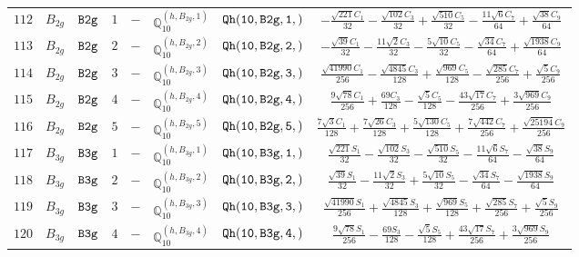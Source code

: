 \documentclass[fleqn,8pt]{jsarticle}
\begin{document}
\begin{table}[ht!]
\begin{center}
\begin{tabular}{cccccccc}
$ 112 $ & $ B_{2g} $ & $ {\tt B2g} $ & $ 1 $ & $ - $ & $ \mathbb{Q}_{10}^{(h,B_{2g},1)} $ & $ {\tt Qh(10,B2g,1,)} $ & $ - \frac{\sqrt{221} C_{1}}{32} - \frac{\sqrt{102} C_{3}}{32} + \frac{\sqrt{510} C_{5}}{32} - \frac{11 \sqrt{6} C_{7}}{64} + \frac{\sqrt{38} C_{9}}{64} $ \\
$ 113 $ & $ B_{2g} $ & $ {\tt B2g} $ & $ 2 $ & $ - $ & $ \mathbb{Q}_{10}^{(h,B_{2g},2)} $ & $ {\tt Qh(10,B2g,2,)} $ & $ - \frac{\sqrt{39} C_{1}}{32} - \frac{11 \sqrt{2} C_{3}}{32} - \frac{5 \sqrt{10} C_{5}}{32} - \frac{\sqrt{34} C_{7}}{64} + \frac{\sqrt{1938} C_{9}}{64} $ \\
$ 114 $ & $ B_{2g} $ & $ {\tt B2g} $ & $ 3 $ & $ - $ & $ \mathbb{Q}_{10}^{(h,B_{2g},3)} $ & $ {\tt Qh(10,B2g,3,)} $ & $ \frac{\sqrt{41990} C_{1}}{256} - \frac{\sqrt{4845} C_{3}}{128} + \frac{\sqrt{969} C_{5}}{128} - \frac{\sqrt{285} C_{7}}{256} + \frac{\sqrt{5} C_{9}}{256} $ \\
$ 115 $ & $ B_{2g} $ & $ {\tt B2g} $ & $ 4 $ & $ - $ & $ \mathbb{Q}_{10}^{(h,B_{2g},4)} $ & $ {\tt Qh(10,B2g,4,)} $ & $ \frac{9 \sqrt{78} C_{1}}{256} + \frac{69 C_{3}}{128} - \frac{\sqrt{5} C_{5}}{128} - \frac{43 \sqrt{17} C_{7}}{256} + \frac{3 \sqrt{969} C_{9}}{256} $ \\
$ 116 $ & $ B_{2g} $ & $ {\tt B2g} $ & $ 5 $ & $ - $ & $ \mathbb{Q}_{10}^{(h,B_{2g},5)} $ & $ {\tt Qh(10,B2g,5,)} $ & $ \frac{7 \sqrt{3} C_{1}}{128} + \frac{7 \sqrt{26} C_{3}}{128} + \frac{5 \sqrt{130} C_{5}}{128} + \frac{7 \sqrt{442} C_{7}}{256} + \frac{\sqrt{25194} C_{9}}{256} $ \\
$ 117 $ & $ B_{3g} $ & $ {\tt B3g} $ & $ 1 $ & $ - $ & $ \mathbb{Q}_{10}^{(h,B_{3g},1)} $ & $ {\tt Qh(10,B3g,1,)} $ & $ \frac{\sqrt{221} S_{1}}{32} - \frac{\sqrt{102} S_{3}}{32} - \frac{\sqrt{510} S_{5}}{32} - \frac{11 \sqrt{6} S_{7}}{64} - \frac{\sqrt{38} S_{9}}{64} $ \\
$ 118 $ & $ B_{3g} $ & $ {\tt B3g} $ & $ 2 $ & $ - $ & $ \mathbb{Q}_{10}^{(h,B_{3g},2)} $ & $ {\tt Qh(10,B3g,2,)} $ & $ \frac{\sqrt{39} S_{1}}{32} - \frac{11 \sqrt{2} S_{3}}{32} + \frac{5 \sqrt{10} S_{5}}{32} - \frac{\sqrt{34} S_{7}}{64} - \frac{\sqrt{1938} S_{9}}{64} $ \\
$ 119 $ & $ B_{3g} $ & $ {\tt B3g} $ & $ 3 $ & $ - $ & $ \mathbb{Q}_{10}^{(h,B_{3g},3)} $ & $ {\tt Qh(10,B3g,3,)} $ & $ \frac{\sqrt{41990} S_{1}}{256} + \frac{\sqrt{4845} S_{3}}{128} + \frac{\sqrt{969} S_{5}}{128} + \frac{\sqrt{285} S_{7}}{256} + \frac{\sqrt{5} S_{9}}{256} $ \\
$ 120 $ & $ B_{3g} $ & $ {\tt B3g} $ & $ 4 $ & $ - $ & $ \mathbb{Q}_{10}^{(h,B_{3g},4)} $ & $ {\tt Qh(10,B3g,4,)} $ & $ \frac{9 \sqrt{78} S_{1}}{256} - \frac{69 S_{3}}{128} - \frac{\sqrt{5} S_{5}}{128} + \frac{43 \sqrt{17} S_{7}}{256} + \frac{3 \sqrt{969} S_{9}}{256} $ \\

\end{tabular}
\end{center}
\end{table}
\end{document}
